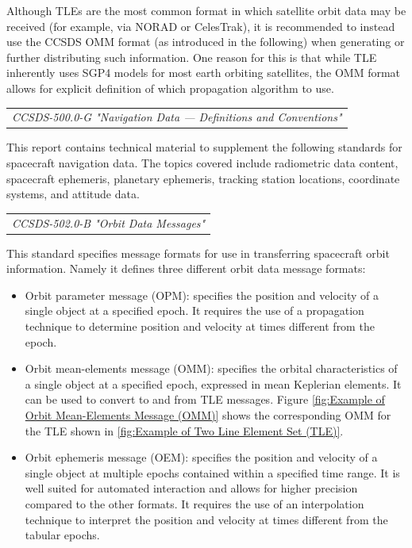 Although TLEs are the most common format in which satellite orbit data may be received (for example, via NORAD or CelesTrak), it is recommended to instead use the CCSDS OMM format (as introduced in the following) when generating or further distributing such information. One reason for this is that while TLE inherently uses SGP4 models for most earth orbiting satellites, the OMM format allows for explicit definition of which propagation algorithm to use.

\begin{tabular}{l}
\textit{CCSDS-500.0-G "Navigation Data — Definitions and Conventions" \cite{CCSDS-500.0-G}} \\
\end{tabular}

This report contains technical material to supplement the following standards for spacecraft navigation data. The topics covered include radiometric data content, spacecraft ephemeris, planetary ephemeris, tracking station locations, coordinate systems, and attitude data. 

\begin{tabular}{l}
\textit{CCSDS-502.0-B "Orbit Data Messages" \cite{CCSDS-502.0-B}} \\
\end{tabular}

This standard specifies message formats for use in transferring spacecraft orbit information. Namely it defines three different orbit data message formats:

\begin{itemize}
\item Orbit parameter message (OPM): specifies the position and velocity of a single object at a specified epoch. It requires the use of a propagation technique to determine position and velocity at times different from the epoch.
\item Orbit mean-elements message (OMM): specifies the orbital characteristics of a single object at a specified epoch, expressed in mean Keplerian elements. It can be used to convert to and from TLE messages. Figure \ref{fig:Example of Orbit Mean-Elements Message (OMM)} shows the corresponding OMM for the TLE shown in \ref{fig:Example of Two Line Element Set (TLE)}.
\item Orbit ephemeris message (OEM): specifies the position and velocity of a single object at multiple epochs contained within a specified time range. It is well suited for automated interaction and allows for higher precision compared to the other formats. It requires the use of an interpolation technique to interpret the position and velocity at times different from the tabular epochs. 
\end{itemize}

